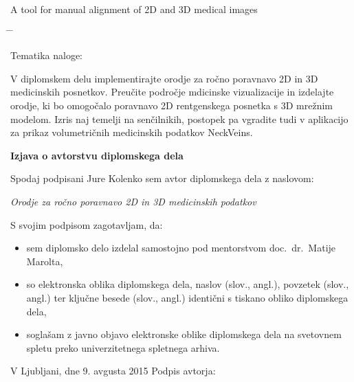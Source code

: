 \documentclass[a4paper, 12pt]{book}
\newcommand{\clearemptydoublepage}{\newpage{\pagestyle{empty}\cleardoublepage}}
\begin{document}
A tool for manual alignment of 2D and 3D medical images
\begin{tabbing}
\hspace{32mm}\= \hspace{6cm} \= \kill




Tematika naloge:
\end{tabbing}
V diplomskem delu implementirajte orodje za ročno poravnavo 2D in 3D medicinskih posnetkov. Preučite področje mdicinske vizualizacije in izdelajte orodje, ki bo omogočalo poravnavo 2D rentgenskega posnetka s 3D mrežnim modelom. Izris naj temelji na senčilnikih, postopek pa vgradite tudi v aplikacijo za prikaz volumetričnih medicinskih podatkov NeckVeins.
\vspace{15mm}
\vspace{2cm}

\clearemptydoublepage

\vspace*{1cm}
\begin{center}
{\Large \textbf{\sc Izjava o avtorstvu diplomskega dela}}
\end{center}

\vspace{1cm}
\noindent Spodaj podpisani Jure Kolenko sem avtor  diplomskega dela z naslovom:

\vspace{0.5cm}
\emph{Orodje za ročno poravnavo 2D in 3D medicinskih podatkov}

\vspace{1.5cm}
\noindent S svojim podpisom zagotavljam, da:
\begin{itemize}
	\item sem diplomsko delo izdelal samostojno pod mentorstvom
		doc.\ dr.\ Matije Marolta,

	\item	so elektronska oblika diplomskega dela, naslov (slov., angl.), povzetek (slov., angl.) ter ključne besede (slov., angl.) identični s tiskano obliko diplomskega dela,
	\item soglašam z javno objavo elektronske oblike diplomskega dela na svetovnem spletu preko univerzitetnega spletnega arhiva.	
\end{itemize}

\vspace{1cm}
\noindent V Ljubljani, dne 9. avgusta 2015 \hfill Podpis avtorja:

\clearemptydoublepage
\end{document}
